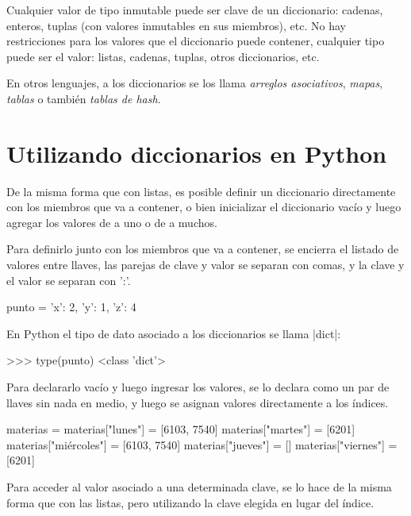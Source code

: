 Cualquier valor de tipo inmutable puede ser clave de un diccionario:
cadenas, enteros, tuplas (con valores inmutables en sus miembros), etc.  No hay
restricciones para los valores que el diccionario puede contener, cualquier
tipo puede ser el valor: listas, cadenas, tuplas, otros diccionarios,
etc.

\begin{sabias_que}
En otros lenguajes, a los diccionarios se los llama \emph{arreglos asociativos},
\emph{mapas}, \emph{tablas} o también \emph{tablas de hash}.
\end{sabias_que}

\section{Utilizando diccionarios en Python}

De la misma forma que con listas, es posible definir un diccionario
directamente con los miembros que va a contener, o bien inicializar el
diccionario vacío y luego agregar los valores de a uno o de a muchos.

Para definirlo junto con los miembros que va a contener, se encierra el
listado de valores entre llaves, las parejas de clave y valor se separan
con comas, y la clave y el valor se separan con ':'.

\begin{codigo-python-sn}
punto = {'x': 2, 'y': 1, 'z': 4}
\end{codigo-python-sn}

\begin{observacion}
En Python el tipo de dato asociado a los diccionarios se llama |dict|:

\begin{codigo-python-sn}
>>> type(punto)
<class 'dict'>
\end{codigo-python-sn}
\end{observacion}

Para declararlo vacío y luego ingresar los valores, se lo declara como un
par de llaves sin nada en medio, y luego se asignan valores directamente a
los índices.

\begin{codigo-python-sn}
materias = {}
materias["lunes"] = [6103, 7540]
materias["martes"] = [6201]
materias["miércoles"] = [6103, 7540]
materias["jueves"] = []
materias["viernes"] = [6201]
\end{codigo-python-sn}

Para acceder al valor asociado a una determinada clave, se lo hace
de la misma forma que con las listas, pero utilizando la clave
elegida en lugar del índice.

